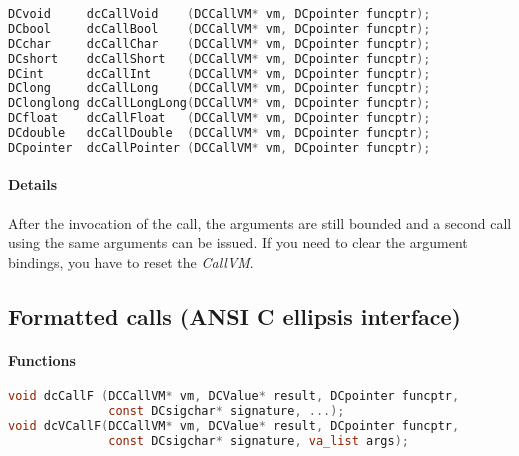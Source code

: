 \begin{lstlisting}[language=c]
DCvoid     dcCallVoid    (DCCallVM* vm, DCpointer funcptr);
DCbool     dcCallBool    (DCCallVM* vm, DCpointer funcptr);
DCchar     dcCallChar    (DCCallVM* vm, DCpointer funcptr);
DCshort    dcCallShort   (DCCallVM* vm, DCpointer funcptr);
DCint      dcCallInt     (DCCallVM* vm, DCpointer funcptr);
DClong     dcCallLong    (DCCallVM* vm, DCpointer funcptr);
DClonglong dcCallLongLong(DCCallVM* vm, DCpointer funcptr);
DCfloat    dcCallFloat   (DCCallVM* vm, DCpointer funcptr);
DCdouble   dcCallDouble  (DCCallVM* vm, DCpointer funcptr);
DCpointer  dcCallPointer (DCCallVM* vm, DCpointer funcptr);
\end{lstlisting}

\paragraph{Details}

After the invocation of the call, the arguments are still bounded and a second call using the
same arguments can be issued. If you need to clear the argument bindings, 
you have to reset the \emph{CallVM}.

\pagebreak

\subsection{Formatted calls (ANSI C ellipsis interface)}

\paragraph{Functions}

\begin{lstlisting}[language=c]
void dcCallF (DCCallVM* vm, DCValue* result, DCpointer funcptr, 
              const DCsigchar* signature, ...);
void dcVCallF(DCCallVM* vm, DCValue* result, DCpointer funcptr, 
              const DCsigchar* signature, va_list args);
\end{lstlisting}



